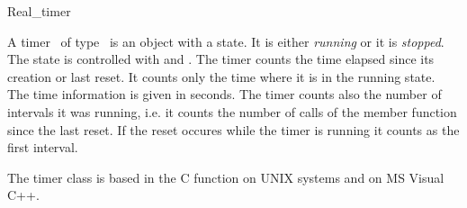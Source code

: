 \begin{ccRefClass}{Real_timer}

\ccDefinition
{}

A timer \ccVar\ of type \ccRefName\ is an object with a state. It is
either {\em running\/} or it is {\em stopped}. The state is controlled
with  and  . The timer counts the
time elapsed since its creation or last reset. It counts only the time
where it is in the running state. The time information is given in seconds.
The timer counts also the number of intervals it was running, i.e. it 
counts the number of calls of the  member function since the 
last reset. If the reset occures while the timer is running it counts as the
first interval.


\ccCreation

\ccPropagateThreeToTwoColumns


\ccOperations

\ccGlue
{}
\ccGlue
{}
\ccGlue
{}

\ccGlue
{} 
\ccGlue
{}
\ccGlue
{}

\ccImplementation

The timer class is based in the C function  on UNIX systems and
 on MS Visual C++.
\end{ccRefClass}

\ccParDims

